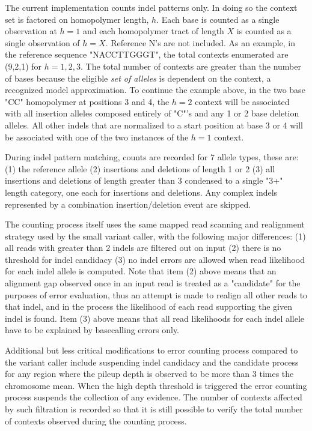 \documentclass{article}
\begin{document}
The current implementation counts indel patterns only. In doing so the context set is factored on homopolymer length, $h$. Each base is counted as a single observation at $h=1$ and each homopolymer tract of length $X$ is counted as a single observation of $h=X$. Reference N's are not included. As an example, in the reference sequence "NACCTTGGGT", the total contexts enumerated are (9,2,1) for $h=1,2,3$. The total number of contexts are greater than the number of bases because the eligible \emph{set of alleles} is dependent on the context, a recognized model approximation. To continue the example above, in the two base "CC" homopolymer at positions 3 and 4, the $h=2$ context will be associated with all insertion alleles composed entirely of "C"'s and any 1 or 2 base deletion alleles. All other indels that are normalized to a start position at base 3 or 4 will be associated with one of the two instances of the $h=1$ context.

During indel pattern matching, counts are recorded for 7 allele types, these are: (1) the reference allele (2) insertions and deletions of length 1 or 2 (3) all insertions and deletions of length greater than 3 condensed to a single "3+" length category, one each for insertions and deletions. Any complex indels represented by a combination insertion/deletion event are skipped.

The counting process itself uses the same mapped read scanning and realignment strategy used by the small variant caller, with the following major differences: (1) all reads with greater than 2 indels are filtered out on input (2) there is no threshold for indel candidacy (3) no indel errors are allowed when read likelihood for each indel allele is computed. Note that item (2) above means that an alignment gap  observed once in an input read is treated as a "candidate" for the purposes of error evaluation, thus an attempt is made to realign all other reads to that indel, and in the process the likelihood of each read supporting the given indel is found. Item (3) above means that all read likelihoods for each indel allele have to be explained by basecalling errors only.

Additional but less critical modifications to error counting process compared to the variant caller include suspending indel candidacy and the candidate process for any region where the pileup depth is observed to be more than 3 times the chromosome mean. When the high depth threshold is triggered the error counting process suspends the collection of any evidence. The number of contexts affected by such filtration is recorded so that it is still possible to verify the total number of contexts observed during the counting process.
\end{document}
